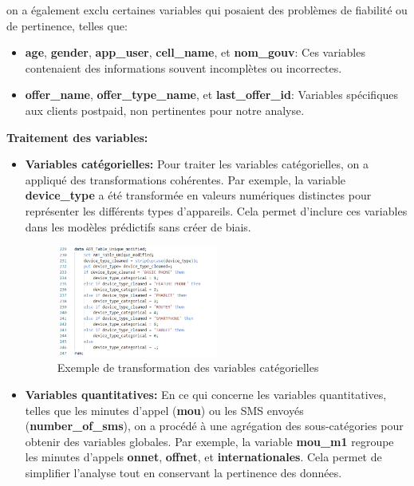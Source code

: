 on a également exclu certaines variables qui posaient des problèmes de fiabilité ou de pertinence, telles que:
\begin{itemize}
    \item \textbf{age}, \textbf{gender}, \textbf{app\_user}, \textbf{cell\_name}, et \textbf{nom\_gouv}: Ces variables contenaient des informations souvent incomplètes ou incorrectes.
    \item \textbf{offer\_name}, \textbf{offer\_type\_name}, et \textbf{last\_offer\_id}: Variables spécifiques aux clients postpaid, non pertinentes pour notre analyse.
\end{itemize}

\noindent \textbf{\checkmark Traitement des variables:}
\begin{itemize}
    \item \textbf{Variables catégorielles:} Pour traiter les variables catégorielles, on a appliqué des transformations cohérentes. Par exemple, la variable \textbf{device\_type} a été transformée en valeurs numériques distinctes pour représenter les différents types d'appareils. Cela permet d'inclure ces variables dans les modèles prédictifs sans créer de biais.

    \begin{figure}[H]
        \centering
        \includegraphics[width=0.5\textwidth]{capture_sas_3.png}
        \caption{Exemple de transformation des variables catégorielles}
        \label{fig:categorical_example}
    \end{figure}

    \item \textbf{Variables quantitatives:} En ce qui concerne les variables quantitatives, telles que les minutes d'appel (\textbf{mou}) ou les SMS envoyés (\textbf{number\_of\_sms}), on a procédé à une agrégation des sous-catégories pour obtenir des variables globales. Par exemple, la variable \textbf{mou\_m1} regroupe les minutes d'appels \textbf{onnet}, \textbf{offnet}, et \textbf{internationales}. Cela permet de simplifier l'analyse tout en conservant la pertinence des données.


\end{itemize}
